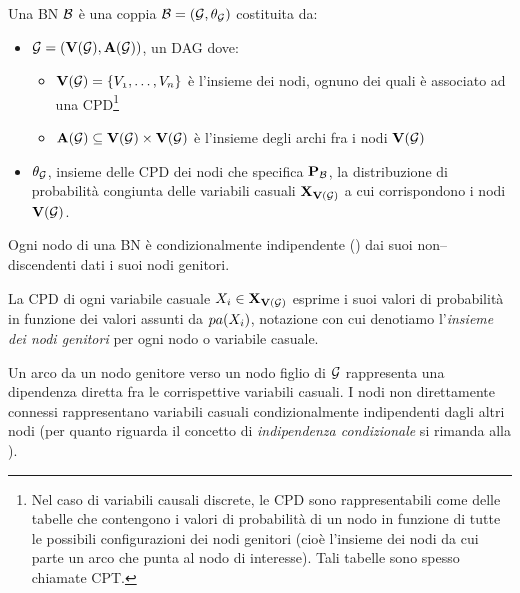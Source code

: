 \begin{definizione}[\acl{BN}]
\label{defn:bn}
Una \acl{BN} $\mathcal{B}$ è una coppia $\mathcal{B}=(\mathcal{G},\theta_{\mathcal{G}})$ costituita da:
\begin{itemize}
    \item $\mathcal{G}=(\mathbf{V}(\mathcal{G}),\mathbf{A}(\mathcal{G}))$, un \acl{DAG} dove:
    \begin{itemize}
        \item $\mathbf{V}(\mathcal{G})=\{\mathnormal{V_1}, \dotsc, \mathnormal{V_n}\}$ è l'insieme dei nodi, ognuno dei quali è associato ad una \acf{CPD}\footnote{Nel caso di variabili causali discrete, le \acs{CPD} sono rappresentabili come delle tabelle che contengono i valori di probabilità di un nodo in funzione di tutte le possibili configurazioni dei nodi genitori (cioè l'insieme dei nodi da cui parte un arco che punta al nodo di interesse). Tali tabelle sono spesso chiamate \acf{CPT}.}
        \item $\mathbf{A}(\mathcal{G})\subseteq\mathbf{V}(\mathcal{G})\times\mathbf{V}(\mathcal{G})$ è l'insieme degli archi fra i nodi $\mathbf{V}(\mathcal{G})$
    \end{itemize}
    \item $\theta_{\mathcal{G}}$, insieme delle \acs{CPD} dei nodi che specifica $\mathbf{P}_{\mathcal{B}}$, la distribuzione di probabilità congiunta delle variabili casuali $\mathbf{X}_{\mathbf{V}(\mathcal{G})}$ a cui corrispondono i nodi $\mathbf{V}(\mathcal{G})$.
\end{itemize}
\end{definizione}
\begin{osservazione}\label{oss:bn-markov-assumption}
Ogni nodo di una \acs{BN} è condizionalmente indipendente () dai suoi non--discendenti dati i suoi nodi genitori.
\end{osservazione}

La \acs{CPD} di ogni variabile casuale $\mathnormal{X_i}\in\mathbf{X}_{\mathbf{V}(\mathcal{G})}$ esprime i suoi valori di probabilità in funzione dei valori assunti da $pa(\mathnormal{X_i})$, notazione con cui denotiamo l'\emph{insieme dei nodi genitori} per ogni nodo o variabile casuale.

Un arco da un nodo genitore verso un nodo figlio di $\mathcal{G}$ rappresenta una dipendenza diretta fra le corrispettive variabili casuali. I nodi non direttamente connessi rappresentano variabili casuali condizionalmente indipendenti dagli altri nodi (per quanto riguarda il concetto di \emph{indipendenza condizionale} si rimanda alla ).

